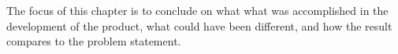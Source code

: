 The focus of this chapter is to conclude on what what was accomplished in the development of the product, what could have been different, and how the result compares to the problem statement.